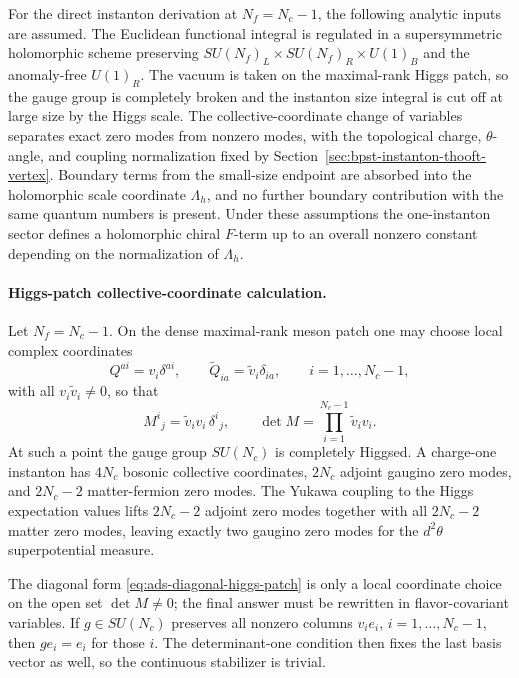 \begin{hypothesis}
\label{hyp:sqcd-one-instanton-calculus}
For the direct instanton derivation at \(N_f=N_c-1\), the following analytic
inputs are assumed.  The Euclidean functional integral is regulated in a
supersymmetric holomorphic scheme preserving
\(SU(N_f)_L\times SU(N_f)_R\times U(1)_B\) and the anomaly-free
\(U(1)_R\).  The vacuum is taken on the maximal-rank Higgs patch, so the
gauge group is completely broken and the instanton size integral is cut off
at large size by the Higgs scale.  The collective-coordinate change of
variables separates exact zero modes from nonzero modes, with the topological
charge, \(\theta\)-angle, and coupling normalization fixed by
Section~\ref{sec:bpst-instanton-thooft-vertex}.  Boundary terms from the
small-size endpoint are absorbed into the holomorphic scale coordinate
\(\Lambda_h\), and no further boundary contribution with the same quantum
numbers is present.  Under these assumptions the one-instanton sector defines
a holomorphic chiral \(F\)-term up to an overall nonzero constant depending on
the normalization of \(\Lambda_h\).
\end{hypothesis}

\paragraph{Higgs-patch collective-coordinate calculation.}
\label{par:ads-higgs-patch-collective-coordinate-calculation}
Let \(N_f=N_c-1\).  On the dense maximal-rank meson patch one may choose
local complex coordinates
\begin{equation}
  Q^{ai}=v_i\delta^{ai},\qquad
  \widetilde Q_{ia}=\widetilde v_i\delta_{ia},
  \qquad i=1,\ldots,N_c-1,
  \label{eq:ads-diagonal-higgs-patch}
\end{equation}
with all \(v_i\widetilde v_i\neq0\), so that
\[
  M^i{}_j=\widetilde v_i v_i\,\delta^i{}_j,\qquad
  \det M=\prod_{i=1}^{N_c-1}\widetilde v_i v_i .
\]
At such a point the gauge group \(SU(N_c)\) is completely Higgsed.  A
charge-one instanton has \(4N_c\) bosonic collective coordinates, \(2N_c\)
adjoint gaugino zero modes, and \(2N_c-2\) matter-fermion zero modes.  The
Yukawa coupling to the Higgs expectation values lifts \(2N_c-2\) adjoint
zero modes together with all \(2N_c-2\) matter zero modes, leaving exactly
two gaugino zero modes for the \(d^2\theta\) superpotential measure.

The diagonal form \eqref{eq:ads-diagonal-higgs-patch} is only a local
coordinate choice on the open set \(\det M\neq0\); the final answer must be
rewritten in flavor-covariant variables.  If \(g\in SU(N_c)\) preserves all
nonzero columns \(v_ie_i\), \(i=1,\ldots,N_c-1\), then \(g e_i=e_i\) for
those \(i\).  The determinant-one condition then fixes the last basis vector
as well, so the continuous stabilizer is trivial.

